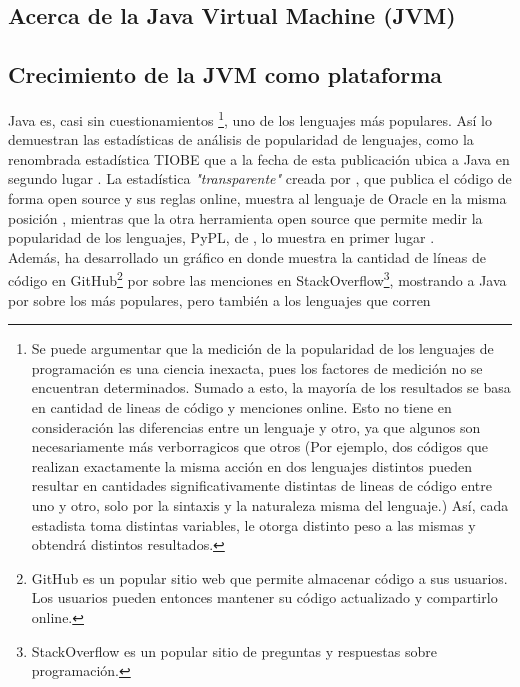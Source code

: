 \subsection{Acerca de la Java Virtual Machine (JVM)}
\label{subsec:intro:about_jvm}


\subsection{Crecimiento de la JVM como plataforma}
\label{subsec:intro:jvm_growth}

Java es, casi sin cuestionamientos \footnote{
	Se puede argumentar que la medición de la popularidad de
	los lenguajes de programación es una ciencia inexacta, pues los factores de medición no
	se encuentran determinados. Sumado a esto, la mayoría de los resultados se basa en
	cantidad de lineas de código y menciones online. Esto no tiene en consideración las
	diferencias entre un lenguaje y otro, ya que algunos son necesariamente más
	verborragicos que otros (Por ejemplo, dos códigos que realizan exactamente la misma
	acción en dos lenguajes distintos pueden resultar en cantidades significativamente
	distintas de lineas de código entre uno y otro, solo por la sintaxis y la naturaleza
	misma del lenguaje.) Así, cada estadista toma distintas variables, le otorga distinto
	peso a las mismas y obtendrá distintos resultados.
}, uno de los lenguajes más populares. Así lo demuestran las estadísticas de análisis de
popularidad de lenguajes, como la renombrada estadística TIOBE que a la fecha de esta
publicación ubica a Java en segundo lugar . La estadística
\emph{"transparente"} creada por , que publica el
código de forma open source y sus reglas online, muestra al lenguaje de Oracle en la misma
posición , mientras que la otra herramienta open source que
permite medir la popularidad de los lenguajes, PyPL, de
, lo muestra en primer lugar
.\\
Además,  ha desarrollado un gráfico en donde muestra la
cantidad de líneas de código en GitHub\footnote{
	GitHub es un popular sitio web que permite almacenar código a sus usuarios. Los usuarios
	pueden entonces mantener su código actualizado y compartirlo online.
} por sobre las menciones en StackOverflow\footnote{
StackOverflow es un popular sitio de preguntas y respuestas sobre programación.
}, mostrando a Java por sobre los más populares, pero también a los lenguajes que corren
